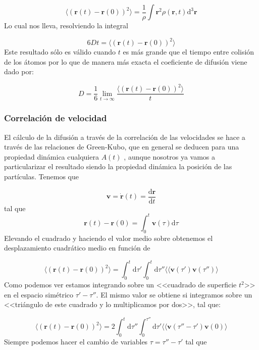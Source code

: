 \documentclass[11pt]{article} %
\newcommand{\D}{\mathrm{d}}
\newcommand{\derivadas}[2]{\frac{\D #1}{\D #2}}
\newcommand{\rn}{\mathbf{r}}
\newcommand{\vn}{\mathbf{v}}
\begin{document}
\begin{equation}
	\langle (\rn(t)-\rn(0))^2 \rangle  = \frac{1}{\rho} \int \rn^2 \rho(\rn,t)\D^3 \rn
\end{equation}
Lo cual nos lleva, resolviendo la integral

\begin{equation}
	6Dt = \langle (\rn(t)-\rn(0))^2 \rangle
\end{equation}
Este resultado sólo es válido cuando $t$ es más grande que el tiempo entre colisión de los átomos \cite{Haile} por lo que de manera más exacta el coeficiente de difusión viene dado por:

\begin{equation}
D = \frac{1}{6} \lim_{t\rightarrow\infty} \frac{\langle (\rn(t)-\rn(0))^2 \rangle}{t}
\end{equation}


\subsubsection{Correlación de velocidad}

El cálculo de la difusión a través de la correlación de las velocidades se hace a través de las relaciones de Green-Kubo, que en general se deducen para una propiedad dinámica cualquiera $A(t)$ \cite{Haile}, aunque nosotros ya vamos a particularizar el resultado siendo la propiedad dinámica la posición de las partículas. Tenemos que 

\begin{equation}
	\vn=\dot{\rn}(t) = \derivadas{\rn}{t}
\end{equation} 
tal que
\begin{equation}
	\rn(t)-\rn(0) = \int_{0}^{t} \vn(\tau) \D \tau
\end{equation}
Elevando el cuadrado y haciendo el valor medio sobre obtenemos el desplazamiento cuadrático medio en función de 

\begin{equation}
	\langle	(\rn(t)-\rn(0))^2 \rangle = \int_{0}^{t}\D \tau' \int_{0}^{t}  \D \tau''  \langle \langle	\vn(\tau') \vn(\tau'') \rangle 
\end{equation}
Como podemos ver estamos integrando sobre un <<cuadrado de superficie $t^2$>> en el espacio simétrico $\tau'-\tau''$. El mismo valor se obtiene si integramos sobre un <<triángulo de este cuadrado y lo multiplicamos por dos>>, tal que:

\begin{equation}
	\langle	(\rn(t)-\rn(0))^2 \rangle = 2 \int_{0}^{t} \D \tau''\int_{0}^{\tau''} \D \tau'   \langle \langle	\vn(\tau''-\tau') \vn(0) \rangle 
\end{equation}
Siempre podemos hacer el cambio de variables $\tau=\tau''-\tau'$ tal que 
\end{document}

